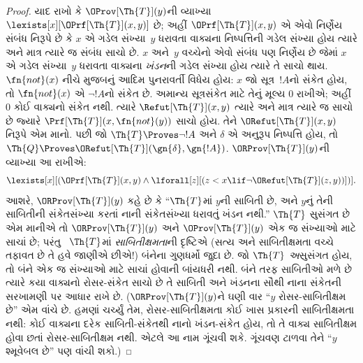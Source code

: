 \begin{proof}
યાદ રાખો કે
$\OProv[\Th{T}](y)$ની
વ્યાખ્યા
$\lexists[x][\OPrf[\Th{T}](x,
  y)]$ છે; અહીં
$\OPrf[\Th{T}](x, y)$
એ એવો નિર્ણેય સંબંધ
નિરૂપે છે કે $x$ એ
ગડેલ સંખ્યા~$y$
ધરાવતા વાક્યના
નિષ્પત્તિની ગડેલ
સંખ્યા હોય ત્યારે અને
માત્ર ત્યારે જ સંબંધ
સાચો છે. $x$ અને~$y$
વચ્ચેનો એવો સંબંધ પણ
નિર્ણેય છે જેમાં $x$ એ
ગડેલ સંખ્યા~$y$ ધરાવતા
વાક્યના \emph{ખંડન}ની
ગડેલ સંખ્યા હોય ત્યારે
તે સાચો થાય. $\fn{not}(x)$
નીચે મુજબનું આદિમ
પુનરાવર્તી વિધેય હોય:
$x$ જો સૂત્ર~$!A$નો
સંકેત હોય, તો
$\fn{not}(x)$ એ
$\lnot
!A$નો સંકેત છે. અમાન્ય સૂત્રસંકેત માટે તેનું મૂલ્ય
$0$ રાખીએ; અહીં $0$ કોઈ વાક્યનો સંકેત નથી.
ત્યારે $\Refut[\Th{T}](x, y)$
ત્યારે અને માત્ર ત્યારે જ
સાચો છે જ્યારે
$\Prf[\Th{T}](x, \fn{not}(y))$
સાચો હોય. તેને
$\ORefut[\Th{T}](x, y)$
નિરૂપે એમ માનો. પછી
જો $\Th{T} \Proves \lnot !A$
અને $\delta$ એ અનુરૂપ
નિષ્પત્તિ હોય, તો
$\Th{Q} \Proves
\ORefut[\Th{T}](\gn{\delta}, \gn{!A})$.
$\ORProv[\Th{T}](y)$ની
વ્યાખ્યા આ રાખીએ:
\[
\lexists[x][(\OPrf[\Th{T}](x,y) \land \lforall[z][(z < x \lif \lnot
  \ORefut[\Th{T}](z,y))])].
\]
આશરે, $\ORProv[\Th{T}](y)$
કહે છે કે ``$\Th{T}$માં
$y$ની સાબિતી છે, અને
$y$નું તેની સાબિતીની
સંકેતસંખ્યા કરતાં નાની
સંકેતસંખ્યા ધરાવતું
ખંડન નથી.''
$\Th{T}$ સુસંગત
છે એમ માનીએ તો
$\ORProv[\Th{T}](y)$ અને
$\OProv[\Th{T}](y)$
એક જ સંખ્યાઓ માટે
સાચાં છે; પરંતુ
~$\Th{T}$માં
\emph{સાબિતીક્ષમતા}ની
દૃષ્ટિએ (સત્ય અને
સાબિતીક્ષમતા વચ્ચે તફાવત
છે તે હવે જાણીએ છીએ!)
બંનેના ગુણધર્મો જુદા છે.
જો $\Th{T}$
\emph{અ}સુસંગત હોય,
તો બંને એક જ સંખ્યાઓ માટે સાચાં હોવાની
બાંયધરી નથી. બંને તરફ સાબિતીઓ મળે છે ત્યારે
કયા વાક્યનો રોસર-સંકેત સાચો છે તે સાબિતી અને
ખંડનના સૌથી નાના સંકેતની સરખામણી પર આધાર રાખે છે.
($\ORProv[\Th{T}](y)$ને
ઘણી વાર ``$y$ રોસર-સાબિતીક્ષમ
છે'' એમ વાંચે છે.
હમણાં ચર્ચ્યું તેમ,
રોસર-સાબિતીક્ષમતા કોઈ
ખાસ પ્રકારની સાબિતીક્ષમતા
નથી: કોઈ વાક્યના દરેક સાબિતી-સંકેતથી નાનો
ખંડન-સંકેત હોય, તો તે વાક્ય
સાબિતીક્ષમ હોવા છતાં રોસર-સાબિતીક્ષમ નથી.
એટલે આ નામ ગૂંચવી શકે.
ગૂંચવણ ટાળવા તેને
``$y$ શ્મૂવેબલ છે'' પણ
વાંચી શકો.)


\end{proof}
